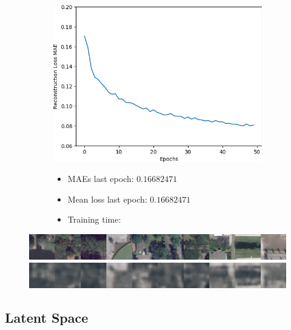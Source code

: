\vspace{-3em}

\begin{figure}[H]
    \centering
    \begin{subfigure}{.5\textwidth}
        \centering
        \includegraphics[width=\textwidth]
        {images/figures/experiments_architecture/mae_graphKernel3adjusted2x2x256_dim1024.png}
    \end{subfigure}%
    \begin{subfigure}{.5\textwidth}
      \begin{itemize}
          \item MAEs last epoch: $0.16682471$
          \item Mean loss last epoch: $0.16682471$
          \item Training time:
      \end{itemize}
    \end{subfigure}
\end{figure}

\vspace{-2em}

\begin{figure}[H]
    \centering
    \includegraphics[width=\textwidth]
    {images/figures/experiments_architecture/inputsKernel3adjusted2x2x256_dim1024.png}
    \includegraphics[width=\textwidth]
    {images/figures/experiments_architecture/reconstructionsKernel3adjusted2x2x256_dim1024.png}
\end{figure}


\subsection{Latent Space} \label{latent_space_experiments}
